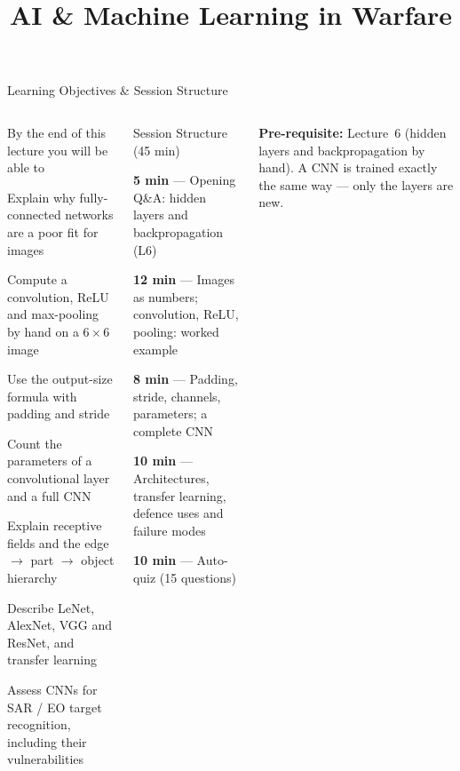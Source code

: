 \documentclass[aspectratio=169,10pt]{beamer}
\title{AI \& Machine Learning in Warfare}
\begin{document}


\begin{frame}{Learning Objectives \& Session Structure}
\begin{columns}[T]
\begin{cbox}{By the end of this lecture you will be able to}
\begin{te}
\item Explain why fully-connected networks are a poor fit for images
\item Compute a convolution, ReLU and max-pooling by hand on a $6\times6$ image
\item Use the output-size formula with padding and stride
\item Count the parameters of a convolutional layer and a full CNN
\item Explain receptive fields and the edge $\to$ part $\to$ object hierarchy
\item Describe LeNet, AlexNet, VGG and ResNet, and transfer learning
\item Assess CNNs for SAR / EO target recognition, including their vulnerabilities
\end{te}
\end{cbox}
\begin{cbox}[ISSAnavy]{Session Structure (45 min)}
\begin{tl}
\item \textbf{5 min} --- Opening Q\&A: hidden layers and backpropagation (L6)
\item \textbf{12 min} --- Images as numbers; convolution, ReLU, pooling: worked example
\item \textbf{8 min} --- Padding, stride, channels, parameters; a complete CNN
\item \textbf{10 min} --- Architectures, transfer learning, defence uses and failure modes
\item \textbf{10 min} --- Auto-quiz (15 questions)
\end{tl}
\end{cbox}
\begin{ibox}\textbf{Pre-requisite:} Lecture~6 (hidden layers and backpropagation by hand). A CNN is trained exactly the same way --- only the layers are new.\end{ibox}
\end{columns}
\end{frame}
\end{document}
